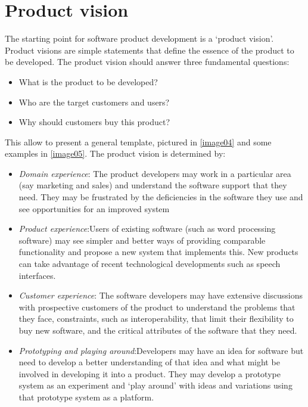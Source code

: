 \documentclass[10pt,a4paper]{report}
\begin{document}
\section{Product vision}
The starting point for software product development is a ‘product vision’. Product visions are simple statements that define the essence of the product to be developed.
The product vision should answer three fundamental questions:

\begin{itemize}


\item What is the product to be developed?

\item Who are the target customers and users?

\item Why should customers buy this product?
\end{itemize}
This allow to present a general template, pictured in \ref{image04} and some examples in \ref{image05}. The product vision is determined by:
\begin{itemize}
	\item \textit{Domain experience}: The product developers may work in a particular area (say marketing and sales) and understand the software support that they need. They may be frustrated by the deficiencies
	in the software they use and see opportunities for an improved system
	\item \textit{Product experience}:Users of existing software (such as word processing software) may see simpler and better
	ways of providing comparable functionality and propose a new system that implements this.
	New products can take advantage of recent technological developments such as speech
	interfaces.
	\item \textit{Customer experience}: The software developers may have extensive discussions with prospective customers of
	the product to understand the problems that they face, constraints, such as interoperability,
	that limit their flexibility to buy new software, and the critical attributes of the software that
	they need.
	\item \textit{Prototyping and playing around}:Developers may have an idea for software but need to develop a better understanding of
	that idea and what might be involved in developing it into a product. They may develop a
	prototype system as an experiment and ‘play around’ with ideas and variations using that
	prototype system as a platform.
\end{itemize}
\end{document}
